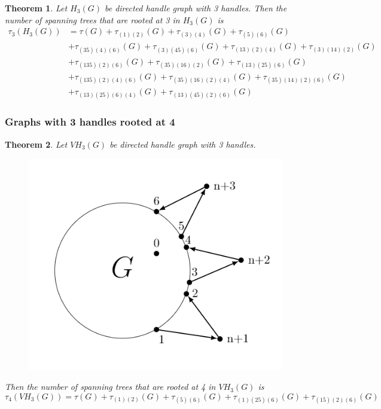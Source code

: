 \documentclass[twoside,11pt]{article}
\newtheorem{theorem}{Theorem}[section]
\numberwithin{equation}{section} \DeclareMathOperator{\Var}{Var}
\newcommand{\bthm}{\begin{theorem}}
\newcommand{\ethm}{\end{theorem}}
\begin{document}
\bthm
Let $H_3(G)$ be directed handle graph with 3 handles. Then the number of spanning trees that are rooted at 3 in $H_3(G)$ is
\begin{equation*}
    \begin{split}
        \tau_3(H_3(G)) &= \tau(G) + \tau_{(1)(2)}(G)+ \tau_{(3)(4)}(G) + \tau_{(5)(6)}(G)\\ 
        &+ \tau_{(35)(4)(6)}(G) + \tau_{(3)(45)(6)}(G) + \tau_{(13)(2)(4)}(G) + \tau_{(3)(14)(2)}(G)\\
        &+ \tau_{(135)(2)(6)}(G) + \tau_{(35)(16)(2)}(G) + \tau_{(13)(25)(6)}(G)\\
        &+ \tau_{(135)(2)(4)(6)}(G) + \tau_{(35)(16)(2)(4)}(G) + \tau_{(35)(14)(2)(6)}(G)\\
&+ \tau_{(13)(25)(6)(4)}(G) + \tau_{(13)(45)(2)(6)}(G)
    \end{split}
\end{equation*}
\ethm

\subsubsection{Graphs with 3 handles rooted at 4}
\bthm
Let $VH_3(G)$ be directed handle graph with 3 handles.
\begin{figure}[H]
    \centering
    \includegraphics[scale=0.4]{tik_3handles.PNG}
\end{figure}
Then the number of spanning trees that are rooted at 4 in $VH_3(G)$ is
\[
\tau_4(VH_3(G)) = \tau(G) + \tau_{(1)(2)}(G)+ \tau_{(5)(6)}(G) + \tau_{(1)(25)(6)}(G)+ \tau_{(15)(2)(6)}(G)
\]
\ethm
\end{document}

